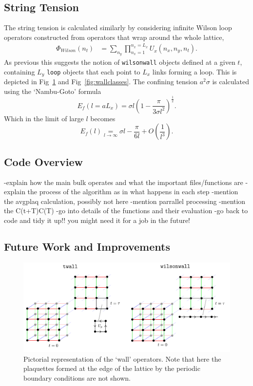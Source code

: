 \documentclass[12pt]{article}
\begin{document}
\subsection{String Tension}
The string tension is calculated similarly by considering infinite Wilson loop operators constructed from operators that wrap around the whole lattice,
\begin{align}
    \Phi_{Wilson}(n_t) &= \sum_{n_y} \prod_{n_x=1}^{n_x=L_x} U_{\hat{x}}(n_x,n_y,n_t).
\end{align}
As previous this suggests the notion of \texttt{wilsonwall} objects defined at a given $t$, containing $L_y$ \texttt{loop} objects that each point to $L_x$ links forming a loop. This is depicted in Fig~\ref{fig:phiops} and Fig~\ref{fig:wallclasses}. The confining tension $a^2\sigma$ is calculated using the `Nambu-Goto' formula
\begin{equation}
    E_f(l = aL_x) = \sigma l\left( 1 - \frac{\pi}{3\sigma l^2} \right)^{\frac{1}{2}}.
\end{equation}
Which in the limit of large $l$ becomes
\begin{equation}
    E_f(l) \underset{l \rightarrow \infty}{=} \sigma l - \frac{\pi}{6l} + O\left(\frac{1}{l^3}\right).
    \label{eg:ng}
\end{equation}

\subsection{Code Overview}
-explain how the main bulk operates and what the important files/functions are
-explain the process of the algorithm as in what happens in each step
-mention the avgplaq calculation, possibly not here
-mention parrallel processing
-mention the C(t+T)C(T)
-go into details of the functions and their evaluation
-go back to code and tidy it up!! you might need it for a job in the future!

\subsection{Future Work and Improvements}


\begin{figure}
\centering
\includegraphics[width=\linewidth]{wallops.pdf}
\caption{\label{fig:phiops} Pictorial representation of the `wall' operators. Note that here the plaquettes formed at the edge of the lattice by the periodic boundary conditions are not shown.}
\end{figure}
\end{document}

